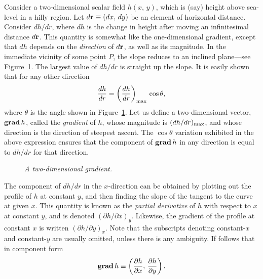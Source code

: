 Consider a two-dimensional scalar field $h(x,\,y)$, which is (say) height above sea-level in a hilly region.
Let  $d{\bf r}\equiv(dx,\,dy)$ be an element of horizontal distance. Consider
$dh/dr$, where $dh$ is the change in height after moving an infinitesimal distance
$d{\bf r}$. This quantity is  somewhat like the one-dimensional gradient, except that
$dh$ depends on the {\em direction}\/ of $d{\bf r}$, as well as its magnitude. 
In the immediate vicinity of some point $P$, the slope reduces to an inclined plane---see Figure~\ref{f15}.
The largest value of $dh/dr$ is straight up the slope. It is easily shown that for any other direction
\begin{equation}
\frac{dh}{dr}= \left(\frac{dh}{dr}\right)_{\rm max}\, \cos\theta,
\end{equation}
where $\theta$ is the angle shown in Figure~\ref{f15}. 
Let us define a two-dimensional vector, ${\bf  grad}\,h$, 
called the {\em gradient}\/ of $h$, whose magnitude is
$(dh/dr)_{\rm max}$, and whose direction is the direction of steepest ascent.
The $\cos\theta$ variation exhibited in the above expression ensures that the component of ${\bf grad}\,h$ in any
direction is equal to $dh/dr$ for that direction. 

\begin{figure}
\epsfysize=2.25in
\centerline{}
\caption{\em A two-dimensional gradient.}\label{f15}
\end{figure}

The component of $dh/dr$ in the $x$-direction can be  obtained by plotting out the
profile of $h$ at constant $y$, and then finding the slope of the tangent to the
curve at given $x$. This quantity is known as the {\em partial derivative}\/ of
$h$ with respect to $x$ at constant $y$, and is denoted $(\partial h/\partial x)_y$.
Likewise, the gradient of the profile at constant $x$ is written
$(\partial h/\partial y)_x$. Note that the subscripts denoting constant-$x$ and
constant-$y$ are usually omitted, unless there is any ambiguity. If follows that
in component form
\begin{equation}
{\bf grad}\,h \equiv \left(\frac{\partial h}{\partial x},\, \frac{\partial h}{\partial y}
\right).
\end{equation}

